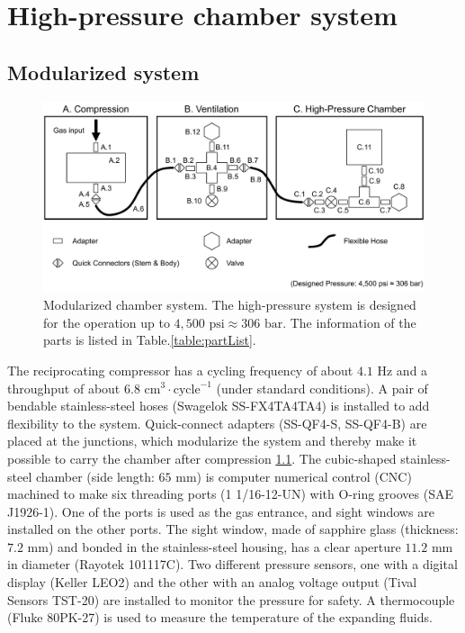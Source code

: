 
\chapter{High-pressure chamber system}
\label{sec:ap2}

\section{Modularized system}
\label{sec:ap2-1}

\begin{figure}[ht!]
\centering
\includegraphics[width=130mm]{figures/ap2/system/moduleSystem.pdf}
\caption{Modularized chamber system. The high-pressure system is designed for the operation up to $4,500 \text{ psi} \approx 306 \text{ bar}$. The information of the parts is listed in Table.\ref{table:partList}.}
\label{fig:moduleSystem}
\end{figure}

The reciprocating compressor has a cycling frequency of about $4.1 \text{ Hz}$ and a throughput of about $6.8 \text{ cm}^{3} \cdot \text{cycle}^{-1}$ (under standard conditions). A pair of bendable stainless-steel hoses (Swagelok SS-FX4TA4TA4) is installed to add flexibility to the system. Quick-connect adapters (SS-QF4-S, SS-QF4-B) are placed at the junctions, which modularize the system and thereby make it possible to carry the chamber after compression \ref{fig:moduleSystem}. The cubic-shaped stainless-steel chamber (side length: $65 \text{ mm}$) is computer numerical control (CNC) machined to make six threading ports (1 1/16-12-UN) with O-ring grooves (SAE J1926-1). One of the ports is used as the gas entrance, and sight windows are installed on the other ports. The sight window, made of sapphire glass (thickness: $7.2 \text{ mm}$) and bonded in the stainless-steel housing, has a clear aperture $11.2 \text{ mm}$ in diameter (Rayotek 101117C). Two different pressure sensors, one with a digital display (Keller LEO2) and the other with an analog voltage output (Tival Sensors TST-20) are installed to monitor the pressure for safety. A thermocouple (Fluke 80PK-27) is used to measure the temperature of the expanding fluids. \pagebreak

